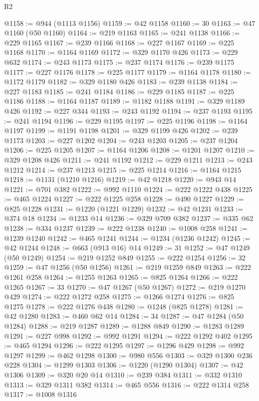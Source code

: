 \begin{lexlean}{R2}
\begin{coremodule}
@1158 := @944 (@1113 @1156)
@1159 := @42 @1158
@1160 := 30
@1163 := @47 @1160 (@50 @1160)
@1164 := @219 @1163
@1165 := @241 @1138
@1166 := @229 @1165
@1167 := @239 @1166
@1168 := @227 @1167
@1169 := @225 @1168
@1170 := @1164 @1169
@1172 := @329 @1170 @426
@1173 := @229 @632
@1174 := @243 @1173
@1175 := @237 @1174
@1176 := @239 @1175
@1177 := @227 @1176
@1178 := @225 @1177
@1179 := @1164 @1178
@1180 := @1172 @1179
@1182 := @329 @1180 @426
@1183 := @239 @1138
@1184 := @227 @1183
@1185 := @241 @1184
@1186 := @229 @1185
@1187 := @225 @1186
@1188 := @1164 @1187
@1189 := @1182 @1188
@1191 := @329 @1189 @426
@1192 := @227 @344
@1193 := @243 @1192
@1194 := @237 @1193
@1195 := @241 @1194
@1196 := @229 @1195
@1197 := @225 @1196
@1198 := @1164 @1197
@1199 := @1191 @1198
@1201 := @329 @1199 @426
@1202 := @239 @1173
@1203 := @227 @1202
@1204 := @243 @1203
@1205 := @237 @1204
@1206 := @225 @1205
@1207 := @1164 @1206
@1208 := @1201 @1207
@1210 := @329 @1208 @426
@1211 := @241 @1192
@1212 := @229 @1211
@1213 := @243 @1212
@1214 := @237 @1213
@1215 := @225 @1214
@1216 := @1164 @1215
@1218 := @1131 (@1210 @1216)
@1219 := @42 @1218
@1220 := @943 @14
@1221 := @701 @382
@1222 := @992 @1110
@1224 := @222 @1222 @438
@1225 := @465 @1224
@1227 := @222 @1225 @258
@1228 := @490 @1227
@1229 := @825 @1228
@1231 := @1220 (@1221 @1229)
@1232 := @42 @1231
@1233 := @374 @18
@1234 := @1233 @14
@1236 := @329 @709 @382
@1237 := @335 @62
@1238 := @334 @1237
@1239 := @222 @1238
@1240 := @1008 @258
@1241 := @1239 @1240
@1242 := @465 @1241
@1244 := @1234 (@1236 @1242)
@1245 := @42 @1244
@1248 := @663 (@913 @16) @14
@1249 := 31
@1252 := @47 @1249 (@50 @1249)
@1254 := @219 @1252 @849
@1255 := @222 @1254
@1256 := 32
@1259 := @47 @1256 (@50 @1256)
@1261 := @219 @1259 @849
@1263 := @222 @1261 @258
@1264 := @1255 @1263
@1265 := @825 @1264
@1266 := @222 @1265
@1267 := 33
@1270 := @47 @1267 (@50 @1267)
@1272 := @219 @1270 @429
@1274 := @222 @1272 @258
@1275 := @1266 @1274
@1276 := @825 @1275
@1278 := @222 @1276 @438
@1280 := @1248 (@825 @1278)
@1281 := @42 @1280
@1283 := @460 @62 @14
@1284 := 34
@1287 := @47 @1284 (@50 @1284)
@1288 := @219 @1287
@1289 := @1288 @849
@1290 := @1283 @1289
@1291 := @227 @998
@1292 := @992 @1291
@1294 := @222 @1292 @402
@1295 := @465 @1294
@1296 := @222 @1295
@1297 := @1296 @429
@1298 := @992 @1297
@1299 := @462 @1298
@1300 := @980 @556
@1303 := @329 @1300 @236 @228
@1304 := @1299 @1303
@1306 := @1220 (@1290 @1304)
@1307 := @42 @1306
@1309 := @320 @20 @14
@1310 := @239 @384
@1311 := @332 @1310
@1313 := @329 @1311 @382
@1314 := @465 @556
@1316 := @222 @1314 @258
@1317 := @1008 @1316

\end{coremodule}
\end{lexlean}
